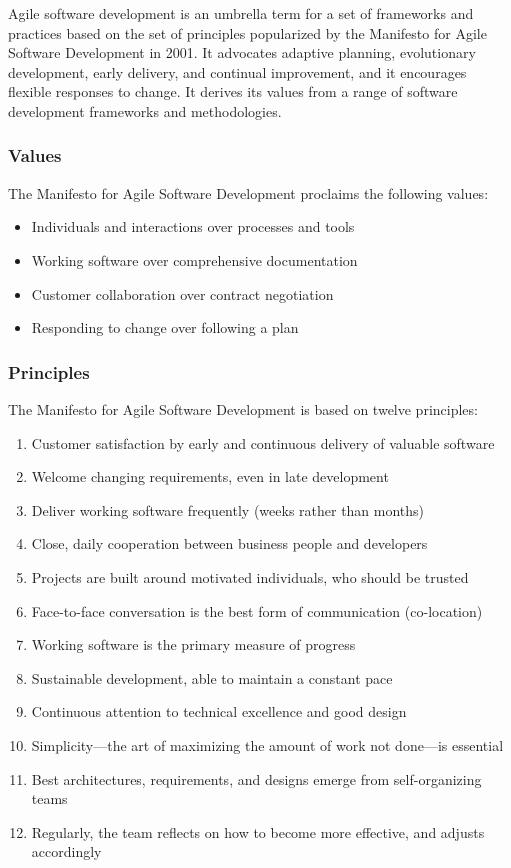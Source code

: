 Agile software development is an umbrella term for a set of frameworks and practices based on the set of principles popularized by the Manifesto for Agile Software Development in 2001.
It advocates adaptive planning, evolutionary development, early delivery, and continual improvement, and it encourages flexible responses to change.
It derives its values from a range of software development frameworks and methodologies.

\subsubsection{Values}

The Manifesto for Agile Software Development proclaims the following values:

\begin{itemize}
	\item Individuals and interactions over processes and tools
	\item Working software over comprehensive documentation
	\item Customer collaboration over contract negotiation
	\item Responding to change over following a plan
\end{itemize}

\subsubsection{Principles}

The Manifesto for Agile Software Development is based on twelve principles:

\begin{enumerate}
	\item Customer satisfaction by early and continuous delivery of valuable software
	\item Welcome changing requirements, even in late development
	\item Deliver working software frequently (weeks rather than months)
	\item Close, daily cooperation between business people and developers
	\item Projects are built around motivated individuals, who should be trusted
	\item Face-to-face conversation is the best form of communication (co-location)
	\item Working software is the primary measure of progress
	\item Sustainable development, able to maintain a constant pace
	\item Continuous attention to technical excellence and good design
	\item Simplicity—the art of maximizing the amount of work not done—is essential
	\item Best architectures, requirements, and designs emerge from self-organizing teams
	\item Regularly, the team reflects on how to become more effective, and adjusts accordingly
\end{enumerate}

